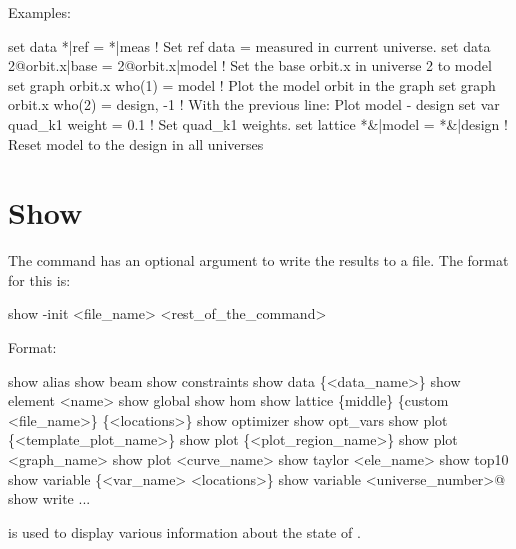 Examples:
\begin{example}
  set data *|ref = *|meas               ! Set ref data = measured in current universe.
  set data 2@orbit.x|base = 2@orbit.x|model 
                                        ! Set the base orbit.x in universe 2 to model
  set graph orbit.x who(1) = model      ! Plot the model orbit in the graph
  set graph orbit.x who(2) = design, -1 ! With the previous line: Plot model - design 
  set var quad\_k1 weight = 0.1          ! Set quad\_k1 weights. 
  set lattice *&|model = *&|design      ! Reset model to the design in all universes
\end{example}

\section{Show}
\label{s:show}

The  command has an optional argument to write the results to a file.
The format for this is:
\begin{example}
  show -init <file_name> <rest_of_the_command>
\end{example}

Format:
\begin{example}
  show alias 
  show beam                    
  show constraints
  show data \{<data_name>\} 
  show element <name>
  show global
  show hom
  show lattice \{middle\} \{custom <file_name>\} \{<locations>\}
  show optimizer
  show opt_vars
  show plot \{<template_plot_name>\}
  show plot \{<plot_region_name>\}
  show plot <graph_name>
  show plot <curve_name>
  show taylor <ele_name>
  show top10
  show variable \{<var_name> <locations>\}
  show variable <universe_number>@
  show write ...
\end{example}

\vskip 0.2in  is used to display various information about
the state of \tao. 

